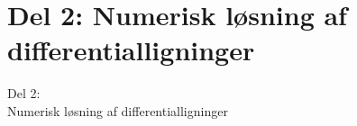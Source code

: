 \section{Del 2: Numerisk løsning af differentialligninger}
\begin{frame}
\centering
\Huge
Del 2: \\
Numerisk løsning af differentialligninger
\end{frame}
%






